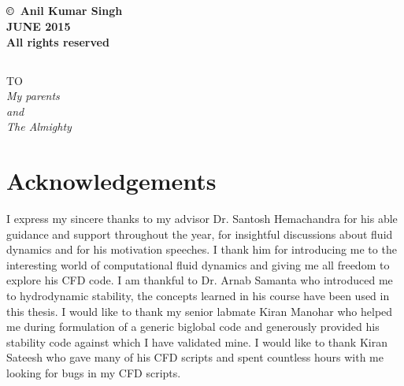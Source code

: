 \documentclass[pdftex,12pt,a4paper,oneside]{report}
\begin{document}


\section*{}
\vspace*{\fill}
\begin{center}

\textbf{\copyright\ Anil Kumar Singh} \\[0.4cm]
\textbf{JUNE 2015} \\[0.4cm]
\textbf{All rights reserved} \\[0.4cm]

\end{center}
\vfill %
\clearpage

\section*{}

\vspace*{\fill}
\begin{center}

\textsc{TO}\\[1.0cm]
\textit{My parents}\\[1.0cm]
\textit{and}\\[1.0cm]
\textit{The Almighty}

\end{center}
\vfill %
\clearpage

\chapter*{\huge Acknowledgements}

\hspace{1cm} I express my sincere thanks to my advisor Dr. Santosh Hemachandra for his able guidance and support throughout the year, 
for insightful discussions about fluid dynamics and for his motivation speeches. I thank him for introducing me
to the interesting world of computational fluid dynamics and giving me all freedom to explore his CFD code. 
I am thankful to Dr. Arnab Samanta who introduced me to hydrodynamic stability, the concepts learned in his course
have been used in this thesis. I would like to thank my senior labmate Kiran Manohar who helped me during formulation
of a generic biglobal code and generously provided his stability code against which I have validated mine. I would like
to thank Kiran Sateesh who gave many of his CFD scripts and  spent countless hours with me looking for bugs in my CFD scripts.
\end{document}
